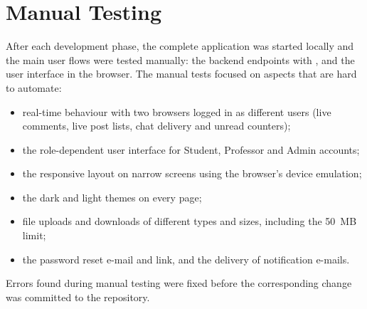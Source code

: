 
\section{Manual Testing}

After each development phase, the complete application was started locally and the main
user flows were tested manually: the backend endpoints with , and the user
interface in the browser. The manual tests focused on aspects that are hard to automate:

\begin{itemize}
  \item real-time behaviour with two browsers logged in as different users (live comments,
    live post lists, chat delivery and unread counters);
  \item the role-dependent user interface for Student, Professor and Admin accounts;
  \item the responsive layout on narrow screens using the browser's device emulation;
  \item the dark and light themes on every page;
  \item file uploads and downloads of different types and sizes, including the 50~MB
    limit;
  \item the password reset e-mail and link, and the delivery of notification e-mails.
\end{itemize}

Errors found during manual testing were fixed before the corresponding change was
committed to the repository.

